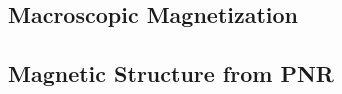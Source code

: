 \documentclass[\main/dresen_thesis.tex]{subfiles}
\renewcommand{\thisPath}{\main/chapters/doublelayers/magnetism}
\begin{document}
  

  \subsection{Macroscopic Magnetization}
  
    \FloatBarrier

  \subsection{Magnetic Structure from PNR}
  
    \FloatBarrier

\end{document}
